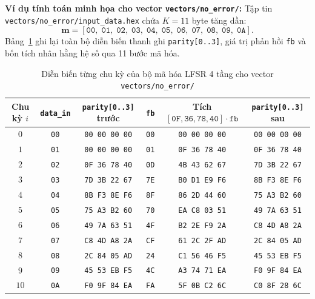 \documentclass[12pt,a4paper]{report}
\begin{document}
\textbf{Ví dụ tính toán minh họa cho vector \texttt{vectors/no\_error/}:} Tập tin \texttt{vectors/no\_error/input\_data.hex} chứa $K = 11$ byte tăng dần:
\[
    \mathbf{m} = [\texttt{00},\; \texttt{01},\; \texttt{02},\; \texttt{03},\; \texttt{04},\; \texttt{05},\; \texttt{06},\; \texttt{07},\; \texttt{08},\; \texttt{09},\; \texttt{0A}].
\]
Bảng~\ref{tab:lfsr-trace} ghi lại toàn bộ diễn biến thanh ghi \texttt{parity[0..3]}, giá trị phản hồi \texttt{fb} và bốn tích nhân hằng hệ số qua 11 bước mã hóa.

\begin{table}[!htb]
    \centering
    \caption{Diễn biến từng chu kỳ của bộ mã hóa LFSR 4 tầng cho vector \texttt{vectors/no\_error/}}
    \label{tab:lfsr-trace}
    \small
    \setlength{\tabcolsep}{4.5pt}
    \begin{tabular}{@{}cccccc@{}}
        \toprule
        \textbf{Chu kỳ $i$} & \textbf{\texttt{data\_in}} & \textbf{\texttt{parity[0..3]} trước} & \textbf{\texttt{fb}} & \textbf{Tích $[\texttt{0F},\texttt{36},\texttt{78},\texttt{40}]\cdot\texttt{fb}$} & \textbf{\texttt{parity[0..3]} sau} \\
        \midrule
        $0$  & \texttt{00} & \texttt{00 00 00 00} & \texttt{00} & \texttt{00 00 00 00} & \texttt{00 00 00 00} \\
        $1$  & \texttt{01} & \texttt{00 00 00 00} & \texttt{01} & \texttt{0F 36 78 40} & \texttt{0F 36 78 40} \\
        $2$  & \texttt{02} & \texttt{0F 36 78 40} & \texttt{0D} & \texttt{4B 43 62 67} & \texttt{7D 3B 22 67} \\
        $3$  & \texttt{03} & \texttt{7D 3B 22 67} & \texttt{7E} & \texttt{B0 D1 E9 F6} & \texttt{8B F3 8E F6} \\
        $4$  & \texttt{04} & \texttt{8B F3 8E F6} & \texttt{8F} & \texttt{86 2D 44 60} & \texttt{75 A3 B2 60} \\
        $5$  & \texttt{05} & \texttt{75 A3 B2 60} & \texttt{70} & \texttt{EA C8 03 51} & \texttt{49 7A 63 51} \\
        $6$  & \texttt{06} & \texttt{49 7A 63 51} & \texttt{4F} & \texttt{B2 2E F9 2A} & \texttt{C8 4D A8 2A} \\
        $7$  & \texttt{07} & \texttt{C8 4D A8 2A} & \texttt{CF} & \texttt{61 2C 2F AD} & \texttt{2C 84 05 AD} \\
        $8$  & \texttt{08} & \texttt{2C 84 05 AD} & \texttt{24} & \texttt{C1 56 46 F5} & \texttt{45 53 EB F5} \\
        $9$  & \texttt{09} & \texttt{45 53 EB F5} & \texttt{4C} & \texttt{A3 74 71 EA} & \texttt{F0 9F 84 EA} \\
        $10$ & \texttt{0A} & \texttt{F0 9F 84 EA} & \texttt{FA} & \texttt{5F 0B C2 6C} & \texttt{C0 8F 28 6C} \\
        \bottomrule
    \end{tabular}
\end{table}
\end{document}
